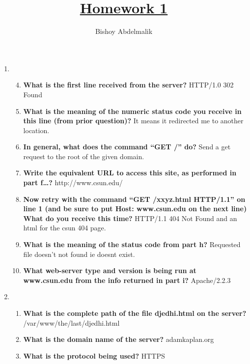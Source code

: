 \documentclass{article}
\title{\underline{\textbf{Homework 1}}}
\author{Bishoy Abdelmalik}
\begin{document}
\maketitle
\begin{enumerate}
    \item \begin{enumerate} \setcounter{enumii}{3}
        \item \textbf{What is the first line received from the server? } \newline HTTP/1.0 302 Found
        \item \textbf{What is the meaning of the numeric status code you receive in this line (from prior 
        question)?} \newline It means it redirected me to another location.
        \item \textbf{In general, what does the command “GET /” do? } \newline Send a get request to the root of the given domain.
        \item \textbf{Write the equivalent URL to access this site, as performed in part f…? } \newline http://www.csun.edu/
        \item \textbf{Now retry with the command “GET /xxyz.html HTTP/1.1” on line 1 (and be sure to 
        put Host: www.csun.edu on the next line) What do you receive this time?} \newline HTTP/1.1 404 Not Found and an html for the csun 404 page.
        \item \textbf{What is the meaning of the status code from part h?} \newline Requested file doesn't not found ie doesnt exist.
        \item \textbf{What web-server type and version is being run at www.csun.edu from the info 
        returned in part i?} \newline Apache/2.2.3         
    \end{enumerate}
    \item \begin{enumerate}
        \item \textbf{What is the complete path of the file djedhi.html on the server?} \newline /var/www/the/last/djedhi.html
        \item \textbf{What is the domain name of the server?} \newline adamkaplan.org
        \item \textbf{What is the protocol being used?} \newline HTTPS

\end{enumerate}
\end{enumerate}
\end{document}
